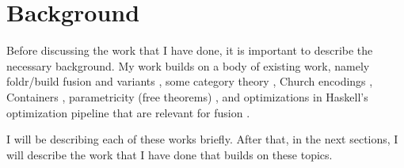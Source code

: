 
\section{Background}
Before discussing the work that I have done, it is important to describe the necessary background.
My work builds on a body of existing work, namely foldr/build fusion and variants \citep{Gill1993,Svenningsson2002,Coutts2007}, some category theory \citep{Ahrens2022}, Church encodings \citep{Harper2011}, Containers \citep{Abbott2005}, parametricity (free theorems) \citep{Wadler1989}, and optimizations in Haskell's optimization pipeline that are relevant for fusion \citep{Jones1996}.

I will be describing each of these works briefly.
After that, in the next sections, I will describe the work that I have done that builds on these topics.

\label{sec:catetgory_theory}


